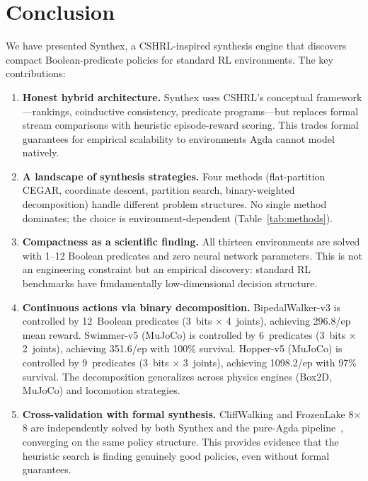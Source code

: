 \documentclass[9pt,a4paper]{article}
\theoremstyle{plain}
\theoremstyle{definition}
\theoremstyle{remark}
\begin{document}
\section{Conclusion}

We have presented Synthex, a CSHRL-inspired synthesis engine
that discovers compact Boolean-predicate policies for standard
RL environments.  The key contributions:

\begin{enumerate}
\item \textbf{Honest hybrid architecture.}  Synthex uses
      CSHRL's conceptual framework---rankings, coinductive
      consistency, predicate programs---but replaces formal
      stream comparisons with heuristic episode-reward scoring.
      This trades formal guarantees for empirical scalability
      to environments Agda cannot model natively.

\item \textbf{A landscape of synthesis strategies.}  Four
      methods (flat-partition CEGAR, coordinate descent, partition
      search, binary-weighted decomposition) handle different
      problem structures.  No single method dominates; the choice
      is environment-dependent (Table~\ref{tab:methods}).

\item \textbf{Compactness as a scientific finding.}  All thirteen
      environments are solved with 1--12 Boolean predicates and
      zero neural network parameters.  This is not an engineering
      constraint but an empirical discovery: standard RL benchmarks
      have fundamentally low-dimensional decision structure.

\item \textbf{Continuous actions via binary decomposition.}
      BipedalWalker-v3 is controlled by 12~Boolean predicates
      (3~bits $\times$ 4~joints), achieving 296.8/ep mean reward.
      Swimmer-v5 (MuJoCo) is controlled by 6~predicates
      (3~bits $\times$ 2~joints), achieving 351.6/ep with 100\%
      survival.  Hopper-v5 (MuJoCo) is controlled by 9~predicates
      (3~bits $\times$ 3~joints), achieving 1098.2/ep with 97\%
      survival.  The decomposition generalizes across physics
      engines (Box2D, MuJoCo) and locomotion strategies.

\item \textbf{Cross-validation with formal synthesis.}
      CliffWalking and FrozenLake 8$\times$8 are independently
      solved by both Synthex and the pure-Agda
      pipeline~\cite{CSHRLSynthesis2026}, converging on the same
      policy structure.  This provides evidence that the heuristic
      search is finding genuinely good policies, even without
      formal guarantees.
\end{enumerate}
\end{document}
